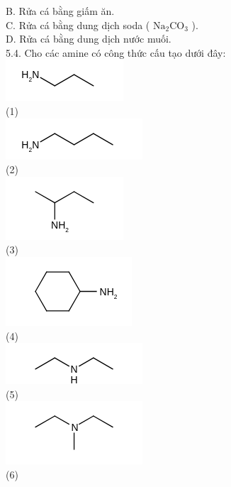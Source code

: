 \documentclass[10pt]{article}
\begin{document}
B. Rửa cá bằng giấm ăn.\\
C. Rửa cá bằng dung dịch soda ( $\mathrm{Na}_{2} \mathrm{CO}_{3}$ ).\\
D. Rửa cá bằng dung dịch nước muối.\\
5.4. Cho các amine có công thức cấu tạo dưới đây:\\
\includegraphics{smile-a5353e20d7f6a8ebab45a8caf662912e1411527a}\\
(1)\\
\includegraphics{smile-b6002fb21f271fdc098bc0632ec42e390641ec80}\\
(2)\\
\includegraphics{smile-8f4e625d8f3ff0f9957a43fed99d795be59aae1a}\\
(3)\\
\includegraphics{smile-d77641550f289396fe80ada4bc918180ecd7d043}\\
(4)\\
\includegraphics{smile-9e219d6ed6648fbc2d74729d0b21e6a2531e5720}\\
(5)\\
\includegraphics{smile-89bf3d1b0fdb353ce8bb474dbdcab9f183367b26}\\
(6)
\end{document}
